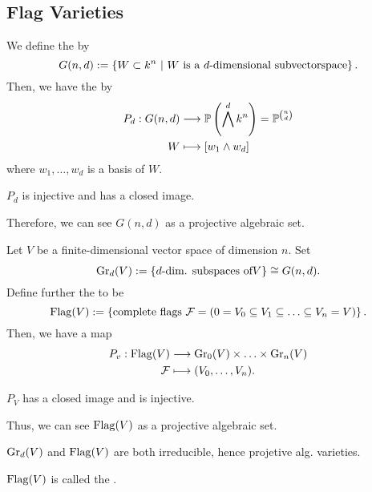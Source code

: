 
\subsection{Flag Varieties}

\begin{definition}
	We define the  by
	\[ G(n,d) := \left\lbrace W \subset k^n ~ | ~ W \text{ is a }d\text{-dimensional subvectorspace}\right\rbrace.  \]
	Then, we have the  by
	\begin{align*}
	P_d : G(n,d) & \overset{}{\longrightarrow} \mathbb{P} \left( \bigwedge^d k^n \right) = \mathbb{P}^{\binom{n}{d}}\\
	W & \longmapsto [w_1\wedge w_d]
	\end{align*}
	where $w_1,\ldots, w_d$ is a basis of $W$.
\end{definition}
\begin{lemma}
	$P_d$ is injective and has a closed image.
	
	Therefore, we can see $G(n,d)$ as a projective algebraic set.
\end{lemma}

\begin{definition}
Let $V$ be a finite-dimensional vector space of dimension $n$. Set
\[ \mathrm{Gr}_d(V) :=\left\lbrace d\text{-dim. subspaces of} V\right\rbrace \overset{}{\cong} G(n,d). \]
Define further the  to be
\[ \mathrm{Flag}(V) := \left\lbrace \text{complete flags } \mathcal{F} = (0 = V_0 \subseteq V_1 \subseteq \ldots \subseteq V_n = V) \right\rbrace. \]
Then, we have a map
\begin{align*}
P_v : \mathrm{Flag}(V) & \overset{}{\longrightarrow} \mathrm{Gr}_0(V) \times \ldots \times \mathrm{Gr}_n(V)\\
\mathcal{F} &\longmapsto (V_0,\ldots, V_n).
\end{align*}
\end{definition}
\begin{lemma}
	$P_V$ has a closed image and is injective.
	
	Thus, we can see $\mathrm{Flag}(V)$ as a projective algebraic set.
\end{lemma}

\begin{lemma}
	$\mathrm{Gr}_d(V)$ and $\mathrm{Flag}(V)$ are both irreducible, hence projetive alg. varieties.
	
	$\mathrm{Flag}(V)$ is called the .
\end{lemma}